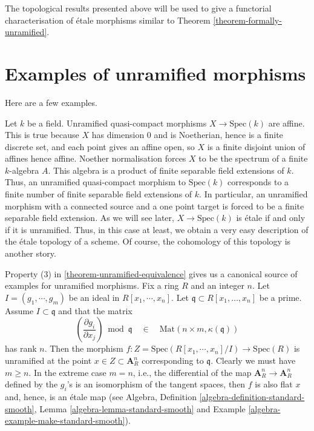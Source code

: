 \noindent
The topological results presented above will be used to give a functorial
characterisation of \'etale morphisms similar to Theorem
\ref{theorem-formally-unramified}.




\section{Examples of unramified morphisms}
\label{section-examples}

\noindent
Here are a few examples.

\begin{example}
\label{example-etale-field-extensions}
Let $k$ be a field.
Unramified quasi-compact morphisms $X \to \text{Spec}(k)$ are affine.
This is true because $X$ has dimension $0$ and is Noetherian,
hence is a finite discrete set, and each point gives an affine open,
so $X$ is a finite disjoint union of affines hence affine.
Noether normalisation forces $X$ to be the spectrum of a finite
$k$-algebra $A$.
This algebra is a product of finite separable field extensions of $k$.
Thus, an unramified quasi-compact morphism to $\text{Spec}(k)$
corresponds to a finite number of finite separable field extensions of $k$.
In particular, an unramified morphism with a connected source and a one point
target is forced to be a finite separable field extension.
As we will see later, $X \to \text{Spec}(k)$ is \'etale if and
only if it is unramified. Thus, in this case at least, we obtain a very easy
description of the \'etale topology of a scheme. Of course, the cohomology of
this topology is another story.
\end{example}

\begin{example}
\label{example-standard-etale}
Property (3) in \ref{theorem-unramified-equivalence} gives us a canonical
source of examples for unramified morphisms.
Fix a ring $R$ and an integer $n$. Let $I = (g_1, \cdots, g_m)$ be an
ideal in $R[x_1, \cdots, x_n]$. Let $\mathfrak q \subset R[x_1, \ldots, x_n]$
be a prime. Assume $I \subset \mathfrak q$ and that the matrix
$$
\left(\frac{\partial g_i}{\partial x_j}\right) \bmod \mathfrak q
\quad\in\quad
\text{Mat}(n \times m, \kappa(\mathfrak q))
$$
has rank $n$. Then the morphism
$f : Z = \text{Spec}(R[x_1, \cdots, x_n]/I) \to \text{Spec}(R)$
is unramified at the point $x \in Z \subset \mathbf{A}^n_R$ corresponding
to $\mathfrak q$. Clearly we must have $m \geq n$.
In the extreme case $m = n$, i.e., the differential of the map
$\mathbf{A}^n_R \to \mathbf{A}^n_R$ defined by the $g_i$'s
is an isomorphism of the tangent spaces, then $f$ is also flat
$x$ and, hence, is an \'etale map (see Algebra,
Definition \ref{algebra-definition-standard-smooth},
Lemma \ref{algebra-lemma-standard-smooth} and
Example \ref{algebra-example-make-standard-smooth}).
\end{example}

